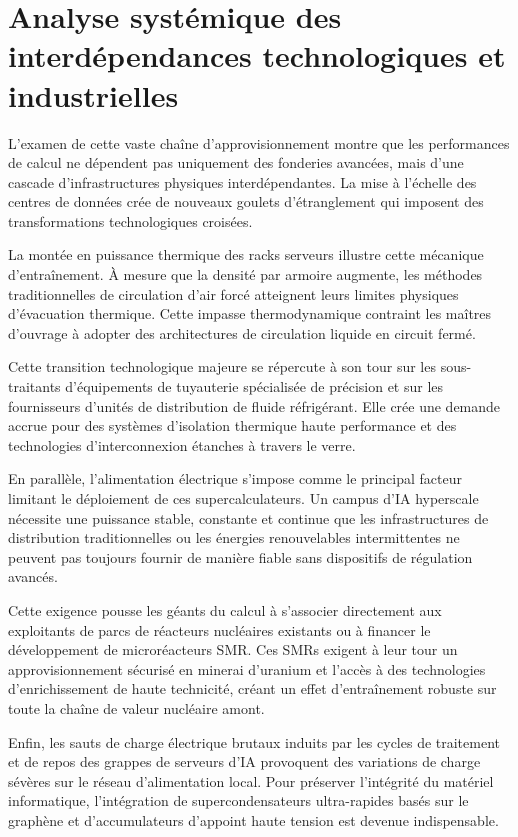 \documentclass[11pt,a4paper]{article}
\begin{document}
\section*{Analyse systémique des interdépendances technologiques et industrielles}

L'examen de cette vaste chaîne d'approvisionnement montre que les performances de calcul ne dépendent pas uniquement des fonderies avancées, mais d'une cascade d'infrastructures physiques interdépendantes. La mise à l'échelle des centres de données crée de nouveaux goulets d'étranglement qui imposent des transformations technologiques croisées.

La montée en puissance thermique des racks serveurs illustre cette mécanique d'entraînement. À mesure que la densité par armoire augmente, les méthodes traditionnelles de circulation d'air forcé atteignent leurs limites physiques d'évacuation thermique. Cette impasse thermodynamique contraint les maîtres d'ouvrage à adopter des architectures de circulation liquide en circuit fermé.

Cette transition technologique majeure se répercute à son tour sur les sous-traitants d'équipements de tuyauterie spécialisée de précision et sur les fournisseurs d'unités de distribution de fluide réfrigérant. Elle crée une demande accrue pour des systèmes d'isolation thermique haute performance et des technologies d'interconnexion étanches à travers le verre.

En parallèle, l'alimentation électrique s'impose comme le principal facteur limitant le déploiement de ces supercalculateurs. Un campus d'IA hyperscale nécessite une puissance stable, constante et continue que les infrastructures de distribution traditionnelles ou les énergies renouvelables intermittentes ne peuvent pas toujours fournir de manière fiable sans dispositifs de régulation avancés.

Cette exigence pousse les géants du calcul à s'associer directement aux exploitants de parcs de réacteurs nucléaires existants ou à financer le développement de microréacteurs SMR. Ces SMRs exigent à leur tour un approvisionnement sécurisé en minerai d'uranium et l'accès à des technologies d'enrichissement de haute technicité, créant un effet d'entraînement robuste sur toute la chaîne de valeur nucléaire amont.

Enfin, les sauts de charge électrique brutaux induits par les cycles de traitement et de repos des grappes de serveurs d'IA provoquent des variations de charge sévères sur le réseau d'alimentation local. Pour préserver l'intégrité du matériel informatique, l'intégration de supercondensateurs ultra-rapides basés sur le graphène et d'accumulateurs d'appoint haute tension est devenue indispensable.
\end{document}
